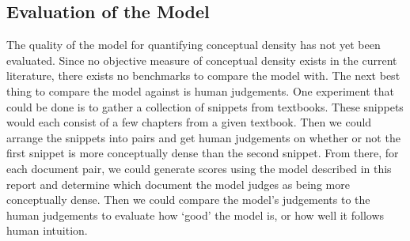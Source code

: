 \documentclass[12pt]{article}
\theoremstyle{grammarstyle}
\begin{document}
\subsection{Evaluation of the Model} \label{sec:evaluation_of_the_model}
The quality of the model for quantifying conceptual density has not yet been evaluated. Since no objective measure of conceptual density exists in the current literature, there exists no benchmarks to compare the model with. The next best thing to compare the model against is human judgements. One experiment that could be done is to gather a collection of snippets from textbooks. These snippets would each consist of a few chapters from a given textbook. Then we could arrange the snippets into pairs and get human judgements on whether or not the first snippet is more conceptually dense than the second snippet. From there, for each document pair, we could generate scores using the model described in this report and determine which document the model judges as being more conceptually dense. Then we could compare the model's judgements to the human judgements to evaluate how `good' the model is, or how well it follows human intuition.


\end{document}
